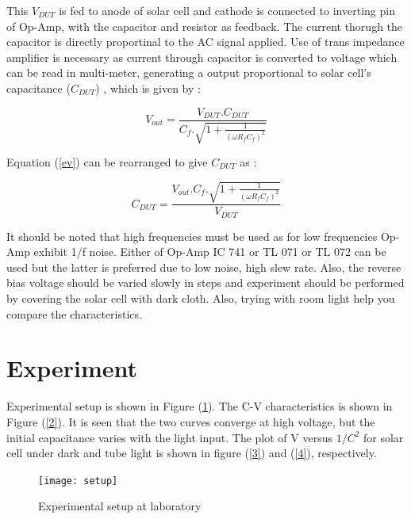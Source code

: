 \documentclass[a4paper, amsfonts, amssymb, amsmath, reprint, showkeys, nofootinbib, twoside]{revtex4-1}
\begin{document}
This $V_{DUT}$ is fed to anode of solar cell and cathode is connected to inverting pin of Op-Amp, with the capacitor and resistor as feedback. The current thorugh the capacitor is directly proportinal to the AC signal applied. Use of trans impedance amplifier is necessary as current through capacitor is converted to voltage which can be read in multi-meter, generating a output proportional to solar cell's capacitance ($C_{DUT}$) , which is given by :

\begin{equation}\label{ev}
	V_{out}=\frac{V_{DUT}.C_{DUT}}{C_{f}.\sqrt{1+\frac{1}{(\omega R_f C_f)^2}}}
\end{equation}

Equation (\ref{ev}) can be rearranged to give $C_{DUT}$ as :

\begin{equation}
	C_{DUT}=\frac{V_{out}.C_f.\sqrt{1+\frac{1}{(\omega R_f C_f)^2}}}{V_{DUT}}
\end{equation}

It should be noted that high frequencies must be used as for low frequencies Op-Amp exhibit 1/f noise. Either of Op-Amp IC 741 or TL 071 or TL 072 can be used but the latter is preferred due to low noise, high slew rate. Also, the reverse bias voltage should be varied slowly in steps and experiment should be performed by covering the solar cell with dark cloth. Also, trying with room light help you compare the characteristics.

\section{Experiment}
Experimental setup is shown in Figure (\ref{s}). The C-V characteristics is shown in Figure (\ref{2}). It is seen that the two curves converge at high voltage, but the initial capacitance varies with the light input. The plot of V versus $1/C^{2}$ for solar cell under dark and tube light is shown in figure (\ref{3}) and  (\ref{4}), respectively. 

\begin{figure}[H]
	\centering
	\texttt{[image: setup]}
	\caption{Experimental setup at laboratory}
	\label{s}
\end{figure}
\end{document}
